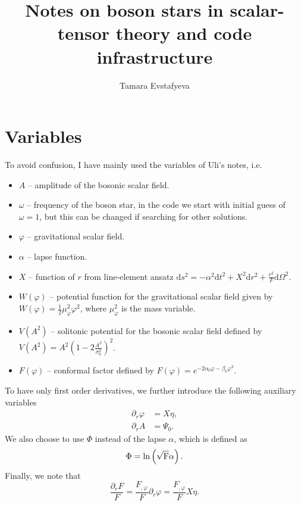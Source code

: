 \documentclass[12pt]{article}
\title{Notes on boson stars in scalar-tensor theory and code infrastructure}
\author{Tamara Evstafyeva}
\date{}
\newcommand{\du}{\mathrm{d}}
\numberwithin{equation}{section}
\begin{document}
\maketitle
\newpage

\section{Variables}
To avoid confusion, I have mainly used the variables of Uli's notes, i.e.
\begin{itemize}
    \item $A$ -- amplitude of the bosonic scalar field.
    \item $\omega$ -- frequency of the boson star, in the code we start with initial guess of $\omega =1$, but this can be changed if searching for other solutions.
    \item $\varphi$ -- gravitational scalar field.
    \item $\alpha$ -- lapse function.
    \item $X$ -- function of $r$ from line-element ansatz $\du s^2 = -\alpha^2 \du t^2 + X^2 \du r^2 + \frac{r^2}{F} \du \Omega^2$.
    \item $W(\varphi)$ -- potential function for the gravitational scalar field given by $W(\varphi) = \frac{1}{2}\mu_{\varphi}^2 \varphi^2$, where $\mu_{\varphi}^2$ is the mass variable.
    \item $V(A^2)$ -- solitonic potential for the bosonic scalar field defined by $V(A^2) = A^2\left(1 - 2\frac{A^2}{\sigma_0^2}\right)^2$.
    \item $F(\varphi)$ -- conformal factor defined by $F(\varphi) = e^{-2\alpha_0 \varphi-\beta_0\varphi^2}$.
\end{itemize}
To have only first order derivatives, we further introduce the following auxiliary variables
\begin{align}
    \partial_r \varphi &= X \eta, \\
    \partial_r A &= \Psi_0.
\end{align}
We also choose to use $\Phi$ instead of the lapse $\alpha$, which is defined as
\begin{equation}
    \Phi = \rm{ln} \left(\sqrt{F} \alpha \right).
\end{equation}
Finally, we note that
\begin{equation}
    \frac{\partial_r F}{F} = \frac{F_{, \varphi}}{F}\partial_r \varphi = \frac{F_{, \varphi}}{F}X \eta.
\end{equation}
\end{document}
